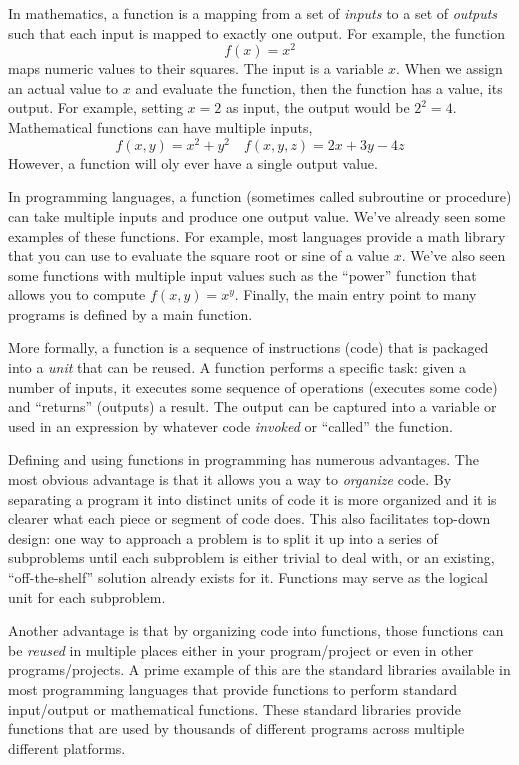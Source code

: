 
\label{chapter:functions}


In mathematics, a function is a mapping from a set of \emph{inputs}
to a set of \emph{outputs} such that each input is mapped to exactly one
output.  For example, the function 
  $$f(x) = x^2$$
maps numeric values to their squares.  The input is a variable $x$.  When
we assign an actual value to $x$ and evaluate the function, then the function
has a value, its output.  For example, setting $x = 2$ as input, the output
would be $2^2 = 4$.  Mathematical functions can have multiple inputs, 
  $$f(x,y) = x^2 + y^2 \quad f(x, y, z) = 2x + 3y - 4z$$
However, a function will oly ever have a single output value.

In programming languages, a \gls{function} (sometimes called subroutine 
or procedure) can take multiple inputs and produce one output value.  We've 
already seen some examples of these functions.  For example, most languages 
provide a math library that you can use to evaluate the square root or 
sine of a value $x$.  We've also seen some functions with multiple input 
values such as the ``power'' function that allows you to compute $f(x, y) = x^y$.
Finally, the main entry point to many programs is defined by a main function.

More formally, a function is a sequence of instructions (code) that is 
packaged into a \emph{unit} that can be reused.  A function performs 
a specific task: given a number of inputs, it executes some sequence 
of operations (executes some code) and ``returns'' (outputs) a result.
The output can be captured into a variable or used in an expression by 
whatever code \emph{invoked} or ``called'' the function.

Defining and using functions in programming has numerous advantages.
The most obvious advantage is that it allows you a way to \emph{organize} 
code.  By separating a program it into distinct units of code it is more organized 
and it is clearer what each piece or segment of code does.  This also 
facilitates  \gls{top-down design}: one way to approach a problem is to 
split it up into a series of subproblems until each subproblem is either trivial 
to deal  with, or an existing, ``off-the-shelf'' solution already exists for it.
Functions may serve as the logical unit for each subproblem.  

Another advantage is that by organizing code into functions, those functions 
can be \emph{reused} in multiple places either in your program/project 
or even in other programs/projects.  A prime example of this are the standard
libraries available in most programming languages that provide functions
to perform standard input/output or mathematical functions.  These standard
libraries provide functions that are used by thousands of different programs
across multiple different platforms.

